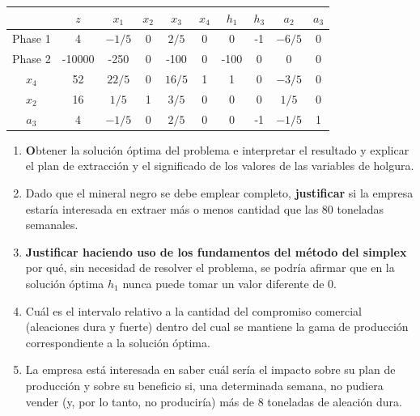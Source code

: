 \begin{center}
\begin{tabular}{c|c|cccccccc|}
 & $z$ & $x_1$ & $x_2$ & $x_3$ & $x_4$ & $h_1$ & $h_3$ & $a_2$ & $a_3$\\ 
\hline
Phase 1 & 4 & $-1/5$ & 0 & $2/5$ & 0 & 0 & -1 & $-6/5$ & 0 \\ 
Phase 2 & -10000 & -250 & 0 & -100 & 0 & -100 & 0 & 0 & 0 \\ 
\hline
$x_4$ & 52  & $22/5$ & 0 & $16/5$ & 1 & 1 & 0 & $-3/5$ & 0\\ 
$x_2$ & 16  & $1/5$ & 1 & $3/5$ & 0 & 0 & 0 & $1/5$ & 0\\ 
$a_3$ & 4  & $-1/5$ & 0 & $2/5$ & 0 & 0 & -1 & $-1/5$ & 1\\ 
\hline
\end{tabular}
\end{center}


\begin{enumerate}


\item \textbf Obtener la solución óptima del problema e {interpretar} el resultado y explicar el plan de
extracción y el significado de los valores de las variables de holgura.


\item Dado que el mineral negro se debe emplear completo, \textbf{justificar} si la empresa estaría interesada en extraer más o menos cantidad que las 80 toneladas semanales.

\item \textbf{Justificar haciendo uso de los fundamentos del método del simplex} por qué, sin necesidad de resolver el problema, se podría afirmar que en la solución óptima $h_1$ nunca puede tomar un valor diferente de 0.

\item Cuál es el intervalo relativo a la cantidad del compromiso comercial (aleaciones dura y fuerte) dentro del cual se mantiene la gama de producción correspondiente a la solución óptima.

\item La empresa está interesada en saber cuál sería el impacto sobre su plan de producción y sobre su beneficio si, una determinada semana, no pudiera vender (y, por lo tanto, no produciría) más de 8 toneladas de aleación dura.

\end{enumerate}


